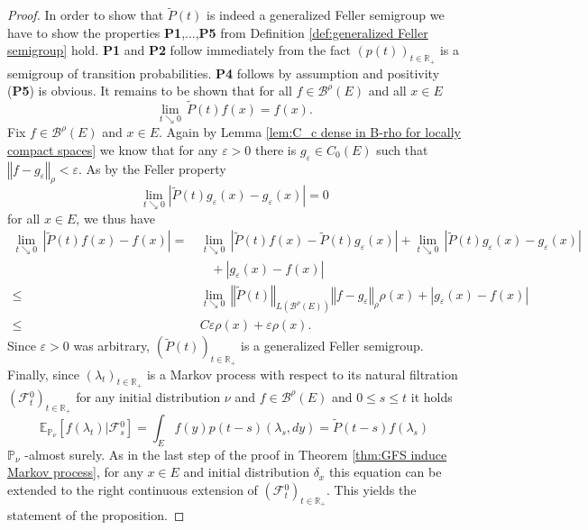 \documentclass[a4paper,12pt]{article}
\theoremstyle{definition}
\theoremstyle{remark}
\numberwithin{equation}{section}
\numberwithin{theorem}{section}
\begin{document}
\begin{proof}
In order to show that $\tilde{P}(t)$ 
is indeed a generalized Feller semigroup we have to show the properties
\textbf{P1},...,\textbf{P5} from Definition \ref{def:generalized Feller semigroup}
hold. \textbf{P1} and \textbf{P2} follow immediately from the fact
$\left(p(t)\right)_{t\in\mathbb{R}_{+}}$ is a semigroup of transition
probabilities. \textbf{P4} follows by assumption and positivity (\textbf{P5})
is obvious. It remains to be shown that for all $f\in\mathcal{\mathscr{B}}^{\rho}(E)$
and all $x\in E$
\[
\underset{t\searrow0}{\lim}\,\tilde{P}(t)f(x)=f(x).
\]
Fix $f\in\mathcal{\mathscr{B}}^{\rho}(E)$ and $x\in E$. Again by Lemma
\ref{lem:C_c dense in  B-rho for locally compact spaces} we know that for any
$\varepsilon>0$ there is $g_{\varepsilon}\in C_{0}(E)$ such that
$\left\Vert f-g_{\varepsilon}\right\Vert _{\rho}<\varepsilon.$  As by the Feller property
\[
\underset{t\searrow0}{\lim} |\tilde{P}(t)g_{\varepsilon}(x)-g_{\varepsilon}(x)|=0
\]
for all $x \in E$, we thus have
\begin{align*}
\underset{t\searrow0}{\lim}\,\left|\tilde{P}(t)f(x)-f(x)\right| =  &\,\underset{t\searrow0}{\lim}\,\left|\tilde{P}(t)f(x)-\tilde{P}(t)g_{\varepsilon}(x)\right| +\underset{t\searrow0}{\lim}\,\left|\tilde{P}(t)g_{\varepsilon}(x)-g_{\varepsilon}(x)\right|\\
 &\quad +\left|g_{\varepsilon}(x)-f(x)\right|\\
 \leq & \, \underset{t\searrow0}{\lim}\,\left\Vert \tilde{P}(t)\right\Vert _{L\left(\mathcal{B}^{\rho}(E)\right)}\left\Vert f-g_{\varepsilon}\right\Vert _{\rho}\rho(x)
+\left|g_{\varepsilon}(x)-f(x)\right|\\
 \leq  & \,C\varepsilon\rho(x)+\varepsilon\rho(x).
\end{align*}
Since $\varepsilon>0$ was arbitrary, $\left(\tilde{P}(t)\right)_{t\in\mathbb{R}_{+}}$ is a generalized
Feller semigroup. 
Finally, since $\left(\lambda_{t}\right)_{t\in\mathbb{R}_{+}}$ is
a Markov process with respect to its natural filtration $\left(\mathcal{F}{}_{t}^{0}\right)_{t\in\mathbb{R}_{+}}$
for any initial distribution $\nu$ and $f\in\mathcal{\mathscr{B}}^{\rho}(E)$
and $0\leq s\leq t$ it holds
\[
\mathbb{E}_{\mathbb{P}_{\nu}}\left[\left.f(\lambda_{t})\right|\mathcal{F}{}_{s}^{0}\right]=\int_{E}f(y)p(t-s)(\lambda_{s},dy)=\tilde{P}(t-s)f(\lambda_{s})
\]
$\mathbb{P}_{\nu}$ -almost surely. As in the last step of the proof
in Theorem \ref{thm:GFS induce Markov process}, for any $x\in E$ and initial distribution $\delta_x$ this equation
can be extended to the right continuous extension of $\left(\mathcal{F}{}_{t}^{0}\right)_{t\in\mathbb{R}_{+}}$. This
yields the statement of the proposition. 
\end{proof}
\end{document}

